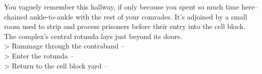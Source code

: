 You vaguely remember this hallway, if only because you spent so much time here--chained ankle-to-ankle with the rest of your comrades. It’s adjoined by a small room used to strip and process prisoners before their entry into the cell block. The complex’s central rotunda lays just beyond its doors.\\

> Rummage through the contraband -- \\
> Enter the rotunda -- \\
> Return to the cell block yard -- 